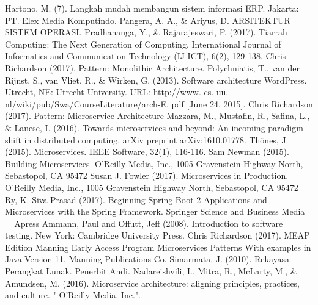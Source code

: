 
\begin{thebibliography}{7}

{Hartono, M. (7). Langkah mudah membangun sistem informasi ERP. Jakarta: PT. Elex Media Komputindo.}
{Pangera, A. A., \& Ariyus, D. ARSITEKTUR SISTEM OPERASI.}
{Pradhananga, Y., \& Rajarajeswari, P. (2017). Tiarrah Computing: The Next Generation of Computing. International Journal of Informatics and Communication Technology (IJ-ICT), 6(2), 129-138.}
{Chris Richardson (2017). Pattern: Monolithic Architecture.}
{Polychniatis, T., van der Rijnst, S., van Vliet, R., \& Wirken, G. (2013). Software architecture WordPress. Utrecht, NE: Utrecht University. URL: http://www. cs. uu. nl/wiki/pub/Swa/CourseLiterature/arch-E. pdf [June 24, 2015].}
{Chris Richardson (2017). Pattern: Microservice Architecture}
{Mazzara, M., Mustafin, R., Safina, L., \& Lanese, I. (2016). Towards microservices and beyond: An incoming paradigm shift in distributed computing. arXiv preprint arXiv:1610.01778.}
{Thönes, J. (2015). Microservices. IEEE Software, 32(1), 116-116.}
{Sam Newman (2015). Building Microservices. O’Reilly Media, Inc., 1005 Gravenstein Highway North, Sebastopol, CA 95472}
{Susan J. Fowler (2017). Microservices in Production. O’Reilly Media, Inc., 1005 Gravenstein Highway North, Sebastopol, CA 95472}
{Ry, K. Siva Prasad (2017). Beginning Spring Boot 2 Applications and Microservices with the Spring Framework. Springer Science and Business Media \_ Apress}
{Ammann, Paul and Offutt, Jeff (2008). Introduction to software testing. New York: Cambridge University Press.}
{Chris Richardson (2017). MEAP Edition Manning Early Access Program Microservices Patterns With examples in Java Version 11. Manning Publications Co.}
{Simarmata, J. (2010). Rekayasa Perangkat Lunak. Penerbit Andi.}
{Nadareishvili, I., Mitra, R., McLarty, M., \& Amundsen, M. (2016). Microservice architecture: aligning principles, practices, and culture. " O'Reilly Media, Inc.".}
\end{thebibliography}

